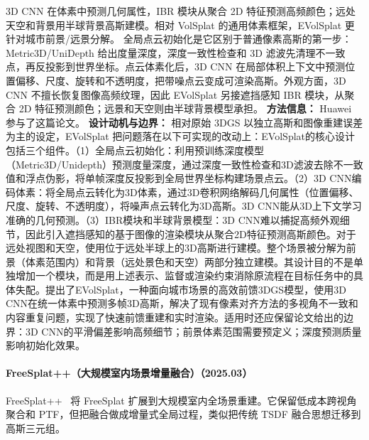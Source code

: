 3D CNN 在体素中预测几何属性，IBR 模块从聚合 2D 特征预测高频颜色；远处天空和背景用半球背景高斯建模。相对 VolSplat 的通用体素框架，EVolSplat 更针对城市前景/远景分解。
全局点云初始化是它区别于普通像素高斯的第一步：Metric3D/UniDepth 给出度量深度，深度一致性检查和 3D 滤波先清理不一致点，再反投影到世界坐标。点云体素化后，3D CNN 在局部体积上下文中预测位置偏移、尺度、旋转和不透明度，把带噪点云变成可渲染高斯。外观方面，3D CNN 不擅长恢复图像高频纹理，因此 EVolSplat 另接遮挡感知 IBR 模块，从聚合 2D 特征预测颜色；远景和天空则由半球背景模型承担。
\textbf{方法信息：} Huawei 参与了这篇论文。
\textbf{设计动机与边界：} 相对原始 3DGS 以独立高斯和图像重建误差为主的设定，EVolSplat 把问题落在以下可实现的改动上：EVolSplat的核心设计包括三个组件。（1）全局点云初始化：利用预训练深度模型（Metric3D/Unidepth）预测度量深度，通过深度一致性检查和3D滤波去除不一致值和浮点伪影，将单帧深度反投影到全局世界坐标构建场景点云。（2）3D CNN编码体素：将全局点云转化为3D体素，通过3D卷积网络解码几何属性（位置偏移、尺度、旋转、不透明度），将噪声点云转化为3D高斯。3D CNN能从3D上下文学习准确的几何预测。（3）IBR模块和半球背景模型：3D CNN难以捕捉高频外观细节，因此引入遮挡感知的基于图像的渲染模块从聚合2D特征预测高斯颜色。对于远处视图和天空，使用位于远处半球上的3D高斯进行建模。整个场景被分解为前景（体素范围内）和背景（远处景色和天空）两部分独立建模。其设计目的不是单独增加一个模块，而是用上述表示、监督或渲染约束消除原流程在目标任务中的具体失配。提出了EVolSplat，一种面向城市场景的高效前馈3DGS模型，使用3D CNN在统一体素中预测多帧3D高斯，解决了现有像素对齐方法的多视角不一致和内容重复问题，实现了快速前馈重建和实时渲染。适用时还应保留论文给出的边界：3D CNN的平滑偏差影响高频细节；前景体素范围需要预定义；深度预测质量影响初始化效果。
\paragraph{FreeSplat++（大规模室内场景增量融合）（2025.03）}
FreeSplat++~\cite{2503_22986} 将 FreeSplat 扩展到大规模室内全场景重建。它保留低成本跨视角聚合和 PTF，但把融合做成增量式全局过程，类似把传统 TSDF 融合思想迁移到高斯三元组。

